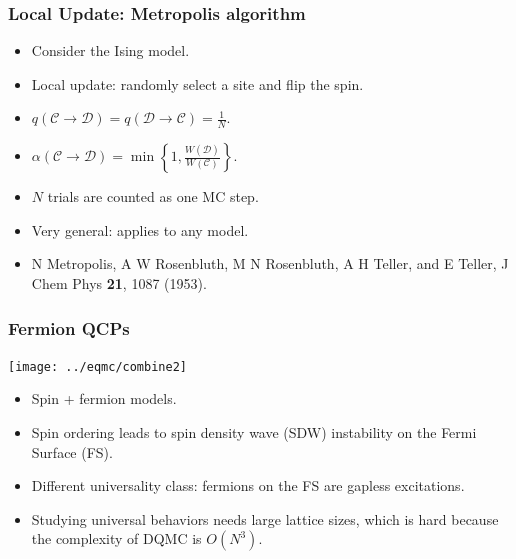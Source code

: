 \documentclass[xcolor=table, 10pt, aspectratio=43]{beamer}
\begin{document}
\begin{frame}
  \frametitle{Local Update: Metropolis algorithm}
  \begin{center}
  \end{center}
  \begin{itemize}
    \item Consider the Ising model.
    \item Local update: randomly select a site and flip the spin.
    \item $q(\mathcal C\rightarrow\mathcal D) = q(\mathcal D\rightarrow\mathcal C) = \frac1N$.
    \item $\alpha(\mathcal C\rightarrow\mathcal D)=\min\left\{1,\frac{W(\mathcal D)}{W(\mathcal C)}\right\}.$
    \item $N$ trials are counted as one MC step.
    \item Very general: applies to any model.
    \item N Metropolis, A W Rosenbluth, M N Rosenbluth, A H Teller, and E Teller, J Chem Phys \textbf{21}, 1087 (1953).
  \end{itemize}
\end{frame}

\begin{frame}
  \frametitle{Fermion QCPs}
  \begin{center}
    \texttt{[image: ../eqmc/combine2]}
  \end{center}
  \begin{itemize}
    \item Spin + fermion models.
    \item Spin ordering leads to spin density wave (SDW) instability on the Fermi Surface (FS).
    \item Different universality class: fermions on the FS are gapless excitations.
    \item Studying universal behaviors needs large lattice sizes, which is hard because the complexity of DQMC is $O(N^3)$.
  \end{itemize}
\end{frame}
\end{document}

